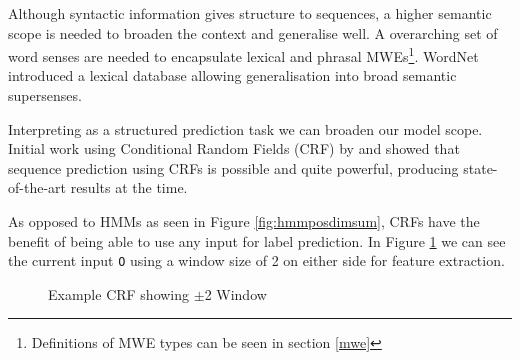 Although syntactic information gives structure to sequences, a higher semantic scope is needed to broaden the context and generalise well. A overarching set of word senses are needed to encapsulate lexical and phrasal MWEs\footnote{Definitions of MWE types can be seen in section \ref{mwe}}. WordNet \cite{fellbaum1998wordnet} introduced a lexical database allowing generalisation into broad semantic supersenses.

Interpreting \dimsum as a structured prediction task we can broaden our model scope. Initial work using Conditional Random Fields (CRF) by \cite{lafferty2001conditional} and \cite{Collins2002} showed that sequence prediction using CRFs is possible and quite powerful, producing state-of-the-art results at the time.

As opposed to HMMs as seen in Figure \ref{fig:hmmposdimsum}, CRFs have the benefit of being able to use any input for label prediction. In Figure \ref{fig:crfwindowdimsum} we can see the current input \texttt{O} using a window size of 2 on either side for feature extraction.

\begin{figure}[H]
  \centering
  \tikzset{font=\footnotesize}
  \caption{Example CRF showing $\pm$2 Window}
  \label{fig:crfwindowdimsum}
\end{figure}

